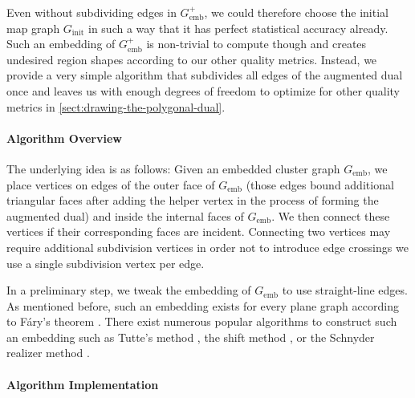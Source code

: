 Even without subdividing edges in $G_\text{emb}^+$, we could therefore choose the initial map graph $G_\text{init}$ in such a way that it has perfect statistical accuracy already. Such an embedding of $G_\text{emb}^+$ is non-trivial to compute though and creates undesired region shapes according to our other quality metrics. Instead, we provide a very simple algorithm that subdivides all edges of the augmented dual once and leaves us with enough degrees of freedom to optimize for other quality metrics in \cref{sect:drawing-the-polygonal-dual}.



\paragraph{Algorithm Overview}

The underlying idea is as follows: Given an embedded cluster graph $G_\text{emb}$, we place vertices on edges of the outer face of $G_\text{emb}$ (those edges bound additional triangular faces after adding the helper vertex in the process of forming the augmented dual) and inside the internal faces of $G_\text{emb}$. We then connect these vertices if their corresponding faces are incident. Connecting two vertices may require additional subdivision vertices in order not to introduce edge crossings \emdash{} we use a single subdivision vertex per edge.

In a preliminary step, we tweak the embedding of $G_\text{emb}$ to use straight-line edges. As mentioned before, such an embedding exists for every plane graph according to Fáry's theorem \cite{fary1948straight}. There exist numerous popular algorithms to construct such an embedding such as Tutte's method \cite{tutte1963draw}, the shift method \cite{fraysseix1990draw}, or the Schnyder realizer method \cite{schnyder1990embedding}. 



\clearpage
\paragraph{Algorithm Implementation}

